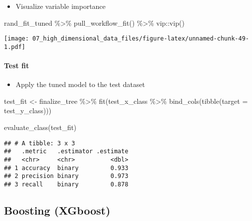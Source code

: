 \documentclass[
]{book}
\newenvironment{Shaded}{\begin{snugshade}}{\end{snugshade}}
\newcommand{\AttributeTok}[1]{\textcolor[rgb]{0.77,0.63,0.00}{#1}}
\newcommand{\FunctionTok}[1]{\textcolor[rgb]{0.00,0.00,0.00}{#1}}
\newcommand{\NormalTok}[1]{#1}
\newcommand{\OtherTok}[1]{\textcolor[rgb]{0.56,0.35,0.01}{#1}}
\newcommand{\SpecialCharTok}[1]{\textcolor[rgb]{0.00,0.00,0.00}{#1}}
\providecommand{\tightlist}{%
  \setlength{\itemsep}{0pt}\setlength{\parskip}{0pt}}
\begin{document}
\begin{itemize}
\tightlist
\item
  Visualize variable importance
\end{itemize}

\begin{Shaded}
\begin{Highlighting}[]
\NormalTok{rand\_fit\_tuned }\SpecialCharTok{\%\textgreater{}\%}
  \FunctionTok{pull\_workflow\_fit}\NormalTok{() }\SpecialCharTok{\%\textgreater{}\%}
\NormalTok{  vip}\SpecialCharTok{::}\FunctionTok{vip}\NormalTok{()}
\end{Highlighting}
\end{Shaded}

\texttt{[image: 07\_high\_dimensional\_data\_files/figure-latex/unnamed-chunk-49-1.pdf]}

\hypertarget{test-fit-2}{%
\paragraph{Test fit}\label{test-fit-2}}

\begin{itemize}
\tightlist
\item
  Apply the tuned model to the test dataset
\end{itemize}

\begin{Shaded}
\begin{Highlighting}[]
\NormalTok{test\_fit }\OtherTok{\textless{}{-}}\NormalTok{ finalize\_tree }\SpecialCharTok{\%\textgreater{}\%}
  \FunctionTok{fit}\NormalTok{(test\_x\_class }\SpecialCharTok{\%\textgreater{}\%} \FunctionTok{bind\_cols}\NormalTok{(}\FunctionTok{tibble}\NormalTok{(}\AttributeTok{target =}\NormalTok{ test\_y\_class)))}

\FunctionTok{evaluate\_class}\NormalTok{(test\_fit)}
\end{Highlighting}
\end{Shaded}

\begin{verbatim}
## # A tibble: 3 x 3
##   .metric   .estimator .estimate
##   <chr>     <chr>          <dbl>
## 1 accuracy  binary         0.933
## 2 precision binary         0.973
## 3 recall    binary         0.878
\end{verbatim}

\hypertarget{boosting-xgboost}{%
\subsection{Boosting (XGboost)}\label{boosting-xgboost}}
\end{document}
